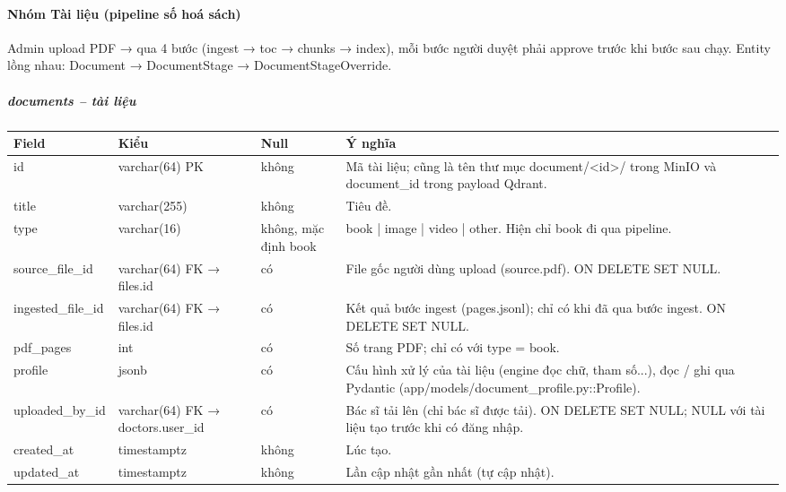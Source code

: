 \paragraph{Nhóm Tài liệu (pipeline số hoá sách)}

Admin upload PDF → qua 4 bước (ingest → toc → chunks → index), mỗi bước người duyệt phải approve trước khi bước sau chạy. Entity lồng nhau: Document → DocumentStage → DocumentStageOverride.

\subparagraph{documents -- tài liệu}
\begin{longtable}{|>{\raggedright\arraybackslash}p{0.250\dimexpr\linewidth-8\tabcolsep\relax}|>{\raggedright\arraybackslash}p{0.250\dimexpr\linewidth-8\tabcolsep\relax}|>{\raggedright\arraybackslash}p{0.250\dimexpr\linewidth-8\tabcolsep\relax}|>{\raggedright\arraybackslash}p{0.250\dimexpr\linewidth-8\tabcolsep\relax}|}
\hline
\textbf{Field} & \textbf{Kiểu} & \textbf{Null} & \textbf{Ý nghĩa} \\ \hline
\endhead
id & varchar(64) PK & không & Mã tài liệu; cũng là tên thư mục document/<id>/ trong MinIO và document\_id trong payload Qdrant. \\ \hline
title & varchar(255) & không & Tiêu đề. \\ \hline
type & varchar(16) & không, mặc định book & book | image | video | other. Hiện chỉ book đi qua pipeline. \\ \hline
source\_file\_id & varchar(64) FK → files.id & có & File gốc người dùng upload (source.pdf). ON DELETE SET NULL. \\ \hline
ingested\_file\_id & varchar(64) FK → files.id & có & Kết quả bước ingest (pages.jsonl); chỉ có khi đã qua bước ingest. ON DELETE SET NULL. \\ \hline
pdf\_pages & int & có & Số trang PDF; chỉ có với type = book. \\ \hline
profile & jsonb & có & Cấu hình xử lý của tài liệu (engine đọc chữ, tham số...), đọc / ghi qua Pydantic (app/\allowbreak models/\allowbreak document\_profile.py::\allowbreak Profile). \\ \hline
uploaded\_by\_id & varchar(64) FK → doctors.user\_id & có & Bác sĩ tải lên (chỉ bác sĩ được tải). ON DELETE SET NULL; NULL với tài liệu tạo trước khi có đăng nhập. \\ \hline
created\_at & timestamptz & không & Lúc tạo. \\ \hline
updated\_at & timestamptz & không & Lần cập nhật gần nhất (tự cập nhật). \\ \hline
\end{longtable}

